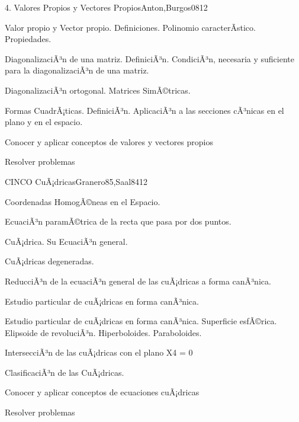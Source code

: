 \begin{syllabus}
\begin{unit}{4. Valores Propios y Vectores Propios}{Anton,Burgos08}{12}
\begin{topics}
      \item Valor propio y Vector propio. Definiciones. Polinomio caracterÃ­stico. Propiedades.
      \item DiagonalizaciÃ³n de una matriz. DefiniciÃ³n. CondiciÃ³n, necesaria y suficiente para la diagonalizaciÃ³n de una matriz.
      \item DiagonalizaciÃ³n ortogonal. Matrices SimÃ©tricas.
	\item Formas CuadrÃ¡ticas. DefiniciÃ³n. AplicaciÃ³n a las secciones cÃ³nicas en el plano y en el espacio.
	\end{topics}

   \begin{unitgoals}
      \item Conocer y aplicar conceptos de valores y vectores propios
	\item Resolver problemas
   \end{unitgoals}
\end{unit}

\begin{unit}{CINCO CuÃ¡dricas}{Granero85,Saal84}{12}
\begin{topics}
      \item Coordenadas HomogÃ©neas en el Espacio.
	\item EcuaciÃ³n paramÃ©trica de la recta que pasa por dos puntos.
	\item CuÃ¡drica. Su EcuaciÃ³n general.
	\item CuÃ¡dricas degeneradas.
	\item ReducciÃ³n de la ecuaciÃ³n general de las cuÃ¡dricas a forma canÃ³nica.
	\item Estudio particular de cuÃ¡dricas en forma canÃ³nica.
	\item Estudio particular de cuÃ¡dricas en forma canÃ³nica. Superficie esfÃ©rica. Elipsoide de revoluciÃ³n. Hiperboloides. Paraboloides.
	\item IntersecciÃ³n de las cuÃ¡dricas con el plano X4 = 0
	\item ClasificaciÃ³n de las CuÃ¡dricas.
   \end{topics}

   \begin{unitgoals}
      \item Conocer y aplicar conceptos de ecuaciones cuÃ¡dricas
	\item Resolver problemas
   \end{unitgoals}
\end{unit}

\begin{coursebibliography}
\end{coursebibliography}
\end{syllabus}
